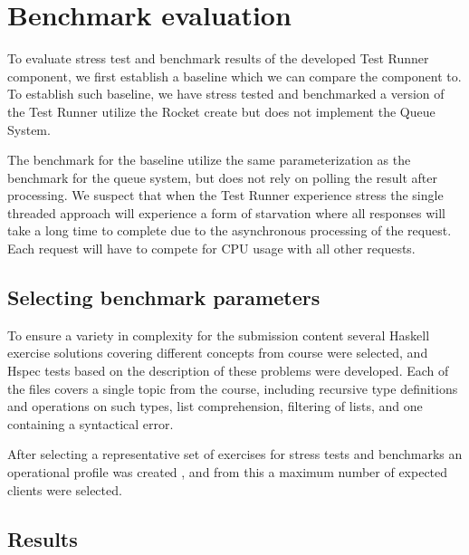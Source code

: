 \section{Benchmark evaluation}
To evaluate stress test and benchmark results of the developed Test Runner component, we first establish a baseline which we can compare the component to. 
To establish such baseline, we have stress tested and benchmarked a version of the Test Runner utilize the Rocket create but does not implement the Queue System. 


The benchmark for the baseline utilize the same parameterization as the benchmark for the queue system, but does not rely on polling the result after processing. 
We suspect that when the Test Runner experience stress the single threaded approach will experience a form of starvation where all responses will take a long time to complete due to the asynchronous processing of the request. Each request will have to compete for CPU usage with all other requests. 

\subsection{Selecting benchmark parameters}
To ensure a variety in complexity for the submission content several Haskell exercise solutions covering different concepts from course were selected, and Hspec tests based on the description of these problems were developed.  
Each of the files covers a single topic from the course, including recursive type definitions and operations on such types, list comprehension, filtering of lists, and one containing a syntactical error.

After selecting a representative set of exercises for stress tests and benchmarks an operational profile was created , and from this a maximum number of expected clients were selected.









\subsection{Results}


